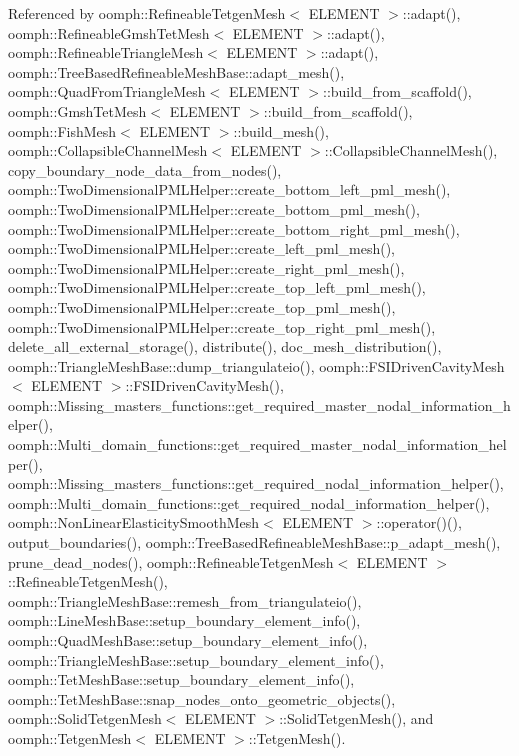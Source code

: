 Referenced by oomph\+::\+Refineable\+Tetgen\+Mesh$<$ E\+L\+E\+M\+E\+N\+T $>$\+::adapt(), oomph\+::\+Refineable\+Gmsh\+Tet\+Mesh$<$ E\+L\+E\+M\+E\+N\+T $>$\+::adapt(), oomph\+::\+Refineable\+Triangle\+Mesh$<$ E\+L\+E\+M\+E\+N\+T $>$\+::adapt(), oomph\+::\+Tree\+Based\+Refineable\+Mesh\+Base\+::adapt\+\_\+mesh(), oomph\+::\+Quad\+From\+Triangle\+Mesh$<$ E\+L\+E\+M\+E\+N\+T $>$\+::build\+\_\+from\+\_\+scaffold(), oomph\+::\+Gmsh\+Tet\+Mesh$<$ E\+L\+E\+M\+E\+N\+T $>$\+::build\+\_\+from\+\_\+scaffold(), oomph\+::\+Fish\+Mesh$<$ E\+L\+E\+M\+E\+N\+T $>$\+::build\+\_\+mesh(), oomph\+::\+Collapsible\+Channel\+Mesh$<$ E\+L\+E\+M\+E\+N\+T $>$\+::\+Collapsible\+Channel\+Mesh(), copy\+\_\+boundary\+\_\+node\+\_\+data\+\_\+from\+\_\+nodes(), oomph\+::\+Two\+Dimensional\+P\+M\+L\+Helper\+::create\+\_\+bottom\+\_\+left\+\_\+pml\+\_\+mesh(), oomph\+::\+Two\+Dimensional\+P\+M\+L\+Helper\+::create\+\_\+bottom\+\_\+pml\+\_\+mesh(), oomph\+::\+Two\+Dimensional\+P\+M\+L\+Helper\+::create\+\_\+bottom\+\_\+right\+\_\+pml\+\_\+mesh(), oomph\+::\+Two\+Dimensional\+P\+M\+L\+Helper\+::create\+\_\+left\+\_\+pml\+\_\+mesh(), oomph\+::\+Two\+Dimensional\+P\+M\+L\+Helper\+::create\+\_\+right\+\_\+pml\+\_\+mesh(), oomph\+::\+Two\+Dimensional\+P\+M\+L\+Helper\+::create\+\_\+top\+\_\+left\+\_\+pml\+\_\+mesh(), oomph\+::\+Two\+Dimensional\+P\+M\+L\+Helper\+::create\+\_\+top\+\_\+pml\+\_\+mesh(), oomph\+::\+Two\+Dimensional\+P\+M\+L\+Helper\+::create\+\_\+top\+\_\+right\+\_\+pml\+\_\+mesh(), delete\+\_\+all\+\_\+external\+\_\+storage(), distribute(), doc\+\_\+mesh\+\_\+distribution(), oomph\+::\+Triangle\+Mesh\+Base\+::dump\+\_\+triangulateio(), oomph\+::\+F\+S\+I\+Driven\+Cavity\+Mesh$<$ E\+L\+E\+M\+E\+N\+T $>$\+::\+F\+S\+I\+Driven\+Cavity\+Mesh(), oomph\+::\+Missing\+\_\+masters\+\_\+functions\+::get\+\_\+required\+\_\+master\+\_\+nodal\+\_\+information\+\_\+helper(), oomph\+::\+Multi\+\_\+domain\+\_\+functions\+::get\+\_\+required\+\_\+master\+\_\+nodal\+\_\+information\+\_\+helper(), oomph\+::\+Missing\+\_\+masters\+\_\+functions\+::get\+\_\+required\+\_\+nodal\+\_\+information\+\_\+helper(), oomph\+::\+Multi\+\_\+domain\+\_\+functions\+::get\+\_\+required\+\_\+nodal\+\_\+information\+\_\+helper(), oomph\+::\+Non\+Linear\+Elasticity\+Smooth\+Mesh$<$ E\+L\+E\+M\+E\+N\+T $>$\+::operator()(), output\+\_\+boundaries(), oomph\+::\+Tree\+Based\+Refineable\+Mesh\+Base\+::p\+\_\+adapt\+\_\+mesh(), prune\+\_\+dead\+\_\+nodes(), oomph\+::\+Refineable\+Tetgen\+Mesh$<$ E\+L\+E\+M\+E\+N\+T $>$\+::\+Refineable\+Tetgen\+Mesh(), oomph\+::\+Triangle\+Mesh\+Base\+::remesh\+\_\+from\+\_\+triangulateio(), oomph\+::\+Line\+Mesh\+Base\+::setup\+\_\+boundary\+\_\+element\+\_\+info(), oomph\+::\+Quad\+Mesh\+Base\+::setup\+\_\+boundary\+\_\+element\+\_\+info(), oomph\+::\+Triangle\+Mesh\+Base\+::setup\+\_\+boundary\+\_\+element\+\_\+info(), oomph\+::\+Tet\+Mesh\+Base\+::setup\+\_\+boundary\+\_\+element\+\_\+info(), oomph\+::\+Tet\+Mesh\+Base\+::snap\+\_\+nodes\+\_\+onto\+\_\+geometric\+\_\+objects(), oomph\+::\+Solid\+Tetgen\+Mesh$<$ E\+L\+E\+M\+E\+N\+T $>$\+::\+Solid\+Tetgen\+Mesh(), and oomph\+::\+Tetgen\+Mesh$<$ E\+L\+E\+M\+E\+N\+T $>$\+::\+Tetgen\+Mesh().

